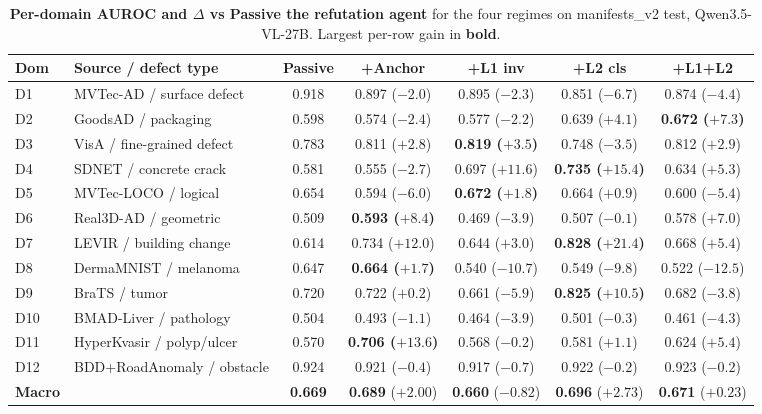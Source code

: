 \begin{table}[t]
\centering
\caption{\textbf{Per-domain AUROC and $\Delta$ vs Passive the refutation agent} for
the four regimes on manifests\_v2 test, Qwen3.5-VL-27B. Largest
per-row gain in \textbf{bold}.}
\label{tab:verb_per_domain}
\small
\setlength{\tabcolsep}{3pt}
\begin{tabular}{llccccc}
\toprule
Dom & Source / defect type & Passive & +Anchor & +L1 inv & +L2 cls & +L1+L2 \\
\midrule
D1  & MVTec-AD / surface defect  & 0.918 & 0.897 ($-2.0$) & 0.895 ($-2.3$) & 0.851 ($-6.7$) & 0.874 ($-4.4$) \\
D2  & GoodsAD / packaging        & 0.598 & 0.574 ($-2.4$) & 0.577 ($-2.2$) & 0.639 ($+4.1$) & \textbf{0.672 ($+7.3$)} \\
D3  & VisA / fine-grained defect & 0.783 & 0.811 ($+2.8$) & \textbf{0.819 ($+3.5$)} & 0.748 ($-3.5$) & 0.812 ($+2.9$) \\
D4  & SDNET / concrete crack     & 0.581 & 0.555 ($-2.7$) & 0.697 ($+11.6$) & \textbf{0.735 ($+15.4$)} & 0.634 ($+5.3$) \\
D5  & MVTec-LOCO / logical       & 0.654 & 0.594 ($-6.0$) & \textbf{0.672 ($+1.8$)} & 0.664 ($+0.9$) & 0.600 ($-5.4$) \\
D6  & Real3D-AD / geometric      & 0.509 & \textbf{0.593 ($+8.4$)} & 0.469 ($-3.9$) & 0.507 ($-0.1$) & 0.578 ($+7.0$) \\
D7  & LEVIR / building change    & 0.614 & 0.734 ($+12.0$) & 0.644 ($+3.0$) & \textbf{0.828 ($+21.4$)} & 0.668 ($+5.4$) \\
D8  & DermaMNIST / melanoma      & 0.647 & \textbf{0.664 ($+1.7$)} & 0.540 ($-10.7$) & 0.549 ($-9.8$) & 0.522 ($-12.5$) \\
D9  & BraTS / tumor              & 0.720 & 0.722 ($+0.2$) & 0.661 ($-5.9$) & \textbf{0.825 ($+10.5$)} & 0.682 ($-3.8$) \\
D10 & BMAD-Liver / pathology     & 0.504 & 0.493 ($-1.1$) & 0.464 ($-3.9$) & 0.501 ($-0.3$) & 0.461 ($-4.3$) \\
D11 & HyperKvasir / polyp/ulcer  & 0.570 & \textbf{0.706 ($+13.6$)} & 0.568 ($-0.2$) & 0.581 ($+1.1$) & 0.624 ($+5.4$) \\
D12 & BDD+RoadAnomaly / obstacle & 0.924 & 0.921 ($-0.4$) & 0.917 ($-0.7$) & 0.922 ($-0.2$) & 0.923 ($-0.2$) \\
\midrule
\textbf{Macro} & & \textbf{0.669} & \textbf{0.689} ($+2.00$) & \textbf{0.660} ($-0.82$) & \textbf{0.696} ($+2.73$) & \textbf{0.671} ($+0.23$) \\
\bottomrule
\end{tabular}
\end{table}

